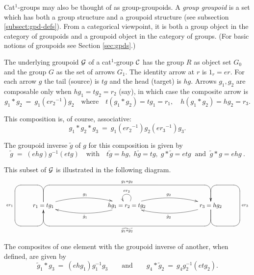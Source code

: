 Cat$^1$-groups may also be thought of as group-groupoids.
A \emph{group groupoid} is a set which has both a group structure and
a groupoid structure (see subsection \ref{subsect:gpd-defs}). 
From a categorical viewpoint, it is both a group object in the
category of groupoids and a groupoid object in the category of groups.
(For basic notions of groupoids see Section \ref{sec:gpds}.) 

The underlying groupoid $\mathcal{G}$  of a cat$^1$-group  $\mathcal{C}$ 
has the group $R$ as object set $G_0$ 
and the group $G$ as the set of arrows $G_1$. 
The identity arrow at  $r$  is  $1_r = er$. 
For each arrow  $g$  the tail (source) is  $tg$ and the head (target) is $hg$. 
Arrows  $g_1,g_2$  are composable only when  $hg_1 = tg_2 = r_2$ (say),
in which case the composite arrow is
\begin{equation} \label{eq:gpgpd-comp}
g_1 * g_2 ~=~ g_1(e{r_2}^{-1})g_2 
\quad\mbox{where}\quad
t(g_1 * g_2) = tg_1 = r_1, \quad
h(g_1 * g_2) = hg_2 = r_3.
\end{equation}

\noindent
This composition is, of course, associative:
$$
g_1 * g_2 * g_3 ~=~ g_1({er_2}^{-1})g_2({er_3}^{-1})g_3.
$$

\noindent
The groupoid inverse  $\tilde{g}$  of  $g$  for this composition is given by
$$
\tilde{g} \; = \; (ehg)g^{-1}(etg)
\quad \mbox{with} \quad  
t \tilde{g} = hg, \; h \tilde{g} = tg, \; g * \tilde{g} = etg  
\;\; \mbox{and} \;\;
\tilde{g} * g = ehg~.
$$  

This subset of $\mathcal{G}$ is illustrated in the following diagram. 
$$
\xy
\xymatrix{
  &&&&&&&& \\
  &  r_1=tg_1 \ar `u[-1,-1] `[1,-1] `[1,0]_{er_1} `[0,0] [0,0]
            \ar@/^3ex/[rrr]^{g_1}
            \ar `u[-1,1] `[0,6]^{g_1 * g_2} [0,6]
  &&& hg_1=r_2=tg_2 \ar@/^3ex/[rrr]^{g_2}
                    \ar@/^3ex/[lll]^{\tilde{g}_1}
                    \ar@(ur,ul)_{er_2}
     &&& r_3=hg_2 \ar `d[1,1] `[-1,1] `[-1,0]_{er_3} `[0,0] [0,0]
                  \ar@/^3ex/[lll]^{\tilde{g}_2}
                  \ar `d[1,-1] `[0,-6]^{\widetilde{g_1 * g_2}} [0,-6] 
         & \\
  &&&&&&&& \\
}
\endxy
$$

\noindent
The composites of one element with the groupoid inverse of another, 
when defined, are given by 
\begin{equation} \label{eq:inv-comps}
\tilde{g}_1 * g_3 ~=~ (ehg_1)g_1^{-1}g_3
\qquad\mbox{and}\qquad
g_4 * \tilde{g}_2 ~=~ g_4g_2^{-1}(etg_2).
\end{equation}


